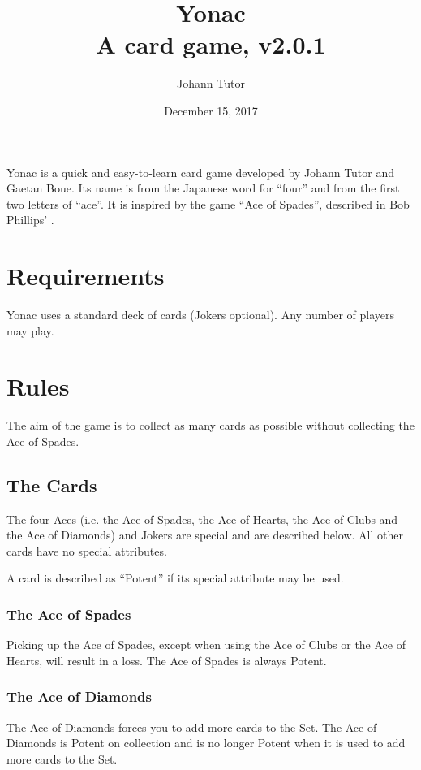 \documentclass{article}
\newcommand\theversion{2.0.1}
\begin{document}
\title{Yonac\\ \large A card game, v\theversion}
\author{Johann Tutor}
\date{December 15, 2017}
\maketitle

Yonac is a quick and easy-to-learn card game developed by Johann Tutor
and Gaetan Boue. Its name is from the Japanese word for ``four'' and
from the first two letters of ``ace''. It is inspired by the game ``Ace
of Spades'', described in Bob Phillips'
.

\tableofcontents

\newpage

\section{Requirements}

Yonac uses a standard deck of cards (Jokers optional). Any number of
players may play.

\section{Rules}

The aim of the game is to collect as many cards as possible without
collecting the Ace of Spades.

\subsection{The Cards}
\label{sec:cards}

The four Aces (i.e. the Ace of Spades, the Ace of Hearts, the Ace of Clubs and
the Ace of Diamonds) and Jokers are special and are described below. All other
cards have no special attributes.

A card is described as ``Potent'' if its special attribute may be used.

\subsubsection{The Ace of Spades}
Picking up the Ace of Spades, except when using the Ace of Clubs or the
Ace of Hearts, will result in a loss. The Ace of Spades is always Potent.

\subsubsection{The Ace of Diamonds}
The Ace of Diamonds forces you to add more cards to the Set. The Ace of
Diamonds is Potent on collection and is no longer Potent when it is used
to add more cards to the Set.
\end{document}

